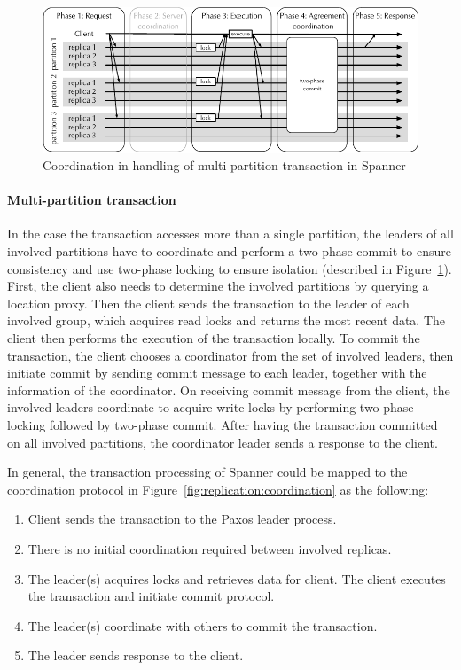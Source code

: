 \begin{figure}[ht!]
  \begin{minipage}[b]{1.0\linewidth}
  \centering
        \includegraphics[width=1\linewidth]{figures/spanner-multi-partition}
  \end{minipage}
  \caption{Coordination in handling of multi-partition transaction in Spanner}
  \label{fig:spanner-multi-partition}
\end{figure}

\paragraph{Multi-partition transaction} In the case the transaction accesses
more than a single partition, the leaders of all involved partitions have to
coordinate and perform a two-phase commit to ensure consistency and use
two-phase locking to ensure isolation (described in
Figure~\ref{fig:spanner-multi-partition}). First, the client also needs to determine
the involved partitions by querying a location proxy. Then the client sends the
transaction to the leader of each involved group, which acquires read locks and
returns the most recent data. The client then performs the execution of the
transaction locally. To commit the transaction, the client chooses a coordinator
from the set of involved leaders, then initiate commit by sending commit message
to each leader, together with the information of the coordinator. On receiving
commit message from the client, the involved leaders coordinate to acquire write
locks by performing two-phase locking followed by two-phase commit. After having
the transaction committed on all involved partitions, the coordinator leader
sends a response to the client.

In general, the transaction processing of Spanner could be mapped to the
coordination protocol in Figure~\ref{fig:replication:coordination} as the
following:
\begin{enumerate}
  \item Client sends the transaction to the Paxos leader process.
  \item There is no initial coordination required between involved replicas.
  \item The leader(s) acquires locks and retrieves data for client. The client
  executes the transaction and initiate commit protocol.
  \item The leader(s) coordinate with others to commit the transaction.
  \item The leader sends response to the client.
\end{enumerate}

